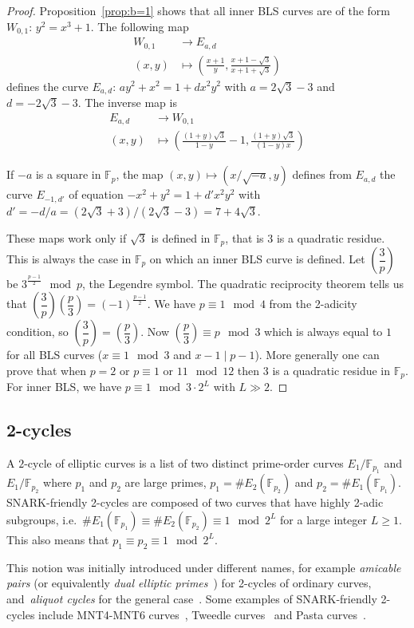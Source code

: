 \documentclass[journal=tches,spthm]{iacrtrans}
\newcommand{\F}{\ensuremath{\mathbb F}}
\begin{document}
\begin{proof}
    Proposition~\ref{prop:b=1} shows that all inner BLS curves are of the form
    $W_{0,1}:\, y^2=x^3+1$. The following map
    \begin{align*}
        W_{0,1} &\rightarrow E_{a,d} \\
        (x,y) &\mapsto (\frac{x+1}{y}, \frac{x+1-\sqrt{3}}{x+1+\sqrt{3}})
    \end{align*}
    defines the curve $E_{a,d}:\, ay^2+x^2=1+dx^2y^2$ with $a=2\sqrt{3}-3$ and $d=-2\sqrt{3}-3$.
    The inverse map is
    \begin{align*}
        E_{a,d} &\rightarrow W_{0,1} \\
        (x,y) &\mapsto (\frac{(1+y)\sqrt{3}}{1-y}-1, \frac{(1+y)\sqrt{3}}{(1-y)x})
    \end{align*}

    If $-a$ is a square in $\F_p$, the map $(x,y) \mapsto (x/\sqrt{-a}, y)$
    defines from $E_{a,d}$ the curve $E_{-1,d'}$ of equation
    $-x^2+y^2=1+d'x^2y^2$ with $d'=-d/a=(2\sqrt{3}+3)/(2\sqrt{3}-3)=7+4\sqrt{3}$.

    These maps work only if $\sqrt{3}$ is defined in $\F_p$, that is $3$ is a
    quadratic residue. This is always the case in $\F_p$ on which an inner BLS
    curve is defined. Let $\left(\dfrac{3}{p}\right)$ be $3^{\frac{p-1}{2}}
    \mod p$, the Legendre symbol. The quadratic reciprocity theorem tells us that
    $\left(\dfrac{3}{p}\right)\left(\dfrac{p}{3}\right)=(-1)^{\frac{p-1}{2}}$.
    We have $p \equiv 1 \mod 4$ from the 2-adicity condition, so
    $\left(\dfrac{3}{p}\right)=\left(\dfrac{p}{3}\right)$.  Now
    $\left(\dfrac{p}{3}\right) \equiv p \mod 3$ which is always equal to $1$
    for all BLS curves ($x \equiv 1 \mod 3$ and $x-1 \mid p-1$). More
    generally one can prove that when $p=2$ or $p \equiv 1$ or $11 \mod 12$
    then 3 is a quadratic residue in $\F_p$. For inner BLS, we have $p \equiv 1
    \mod 3\cdot 2^L$ with $L \gg 2$.
\end{proof}

\subsection{2-cycles}
\begin{definition}
  A $2$-cycle of elliptic curves is a list of two distinct prime-order curves
    $E_1/\F_{p_1}$ and $E_1/\F_{p_2}$ where $p_1$ and $p_2$ are large primes,
    $p_1 = \# E_2(\F_{p_2})$ and $p_2 = \# E_1(\F_{p_1})$. SNARK-friendly
    2-cycles are composed of two curves that have highly 2-adic subgroups,
    i.e.~$\# E_1(\F_{p_1}) \equiv \# E_2(\F_{p_2})  \equiv 1 \mod 2^L$ for a
    large integer $L \geq 1$. This also means that $p_1 \equiv p_2 \equiv 1
    \mod 2^L$.
    \label{def:m-chain-snark-friendly}
\end{definition}
%
This notion was initially introduced under different names, for example
\emph{amicable pairs} (or equivalently \emph{dual elliptic
primes}~\cite{EPRINT:Mihailescu07}) for 2-cycles of ordinary curves,
and~\emph{aliquot cycles} for the general case~\cite{EM:SilSta11}. Some
examples of SNARK-friendly 2-cycles include MNT4-MNT6 curves~\cite{C:BCTV14},
Tweedle curves~\cite{EPRINT:BowGriHop19} and Pasta
curves~\cite{post:Hopwood21}.
\end{document}
